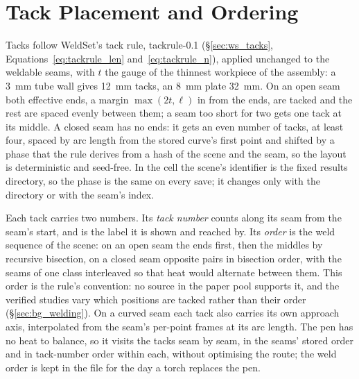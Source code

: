 \section{Tack Placement and Ordering}
\label{sec:mc_tacks}
Tacks follow WeldSet's tack rule, tackrule-0.1 (\S\ref{sec:ws_tacks}, Equations~\ref{eq:tackrule_len}
and~\ref{eq:tackrule_n}), applied unchanged to the weldable seams, with $t$ the gauge
of the thinnest workpiece of the assembly: a 3~mm tube wall gives 12~mm tacks, an 8~mm plate 32~mm. On an
open seam both effective ends, a margin $\max(2t,\ell)$ in from the ends, are tacked and the rest are
spaced evenly between them; a seam too short for two gets one tack at its middle. A closed seam has no
ends: it gets an even number of tacks, at least four, spaced by arc length from the stored curve's first
point and shifted by a phase that the rule derives from a hash of the scene and the seam, so the layout
is deterministic and seed-free. In the cell the scene's identifier is the fixed results directory, so
the phase is the same on every save; it changes only with the directory or with the seam's index.

Each tack carries two numbers. Its \emph{tack number} counts along its seam from the seam's start, and is
the label it is shown and reached by. Its \emph{order} is the weld sequence of the scene: on an open seam the ends
first, then the middles by recursive bisection, on a closed seam opposite pairs in bisection order,
with the seams of one class interleaved so that heat would alternate between them. This order is the
rule's convention: no source in the paper pool supports it, and the verified studies vary which
positions are tacked rather than their order (\S\ref{sec:bg_welding}). On a curved seam each tack also carries its own approach axis, interpolated from
the seam's per-point frames at its arc length. The pen has no heat to balance, so it visits the tacks
seam by seam, in the seams' stored order and in tack-number order within each, without optimising the
route; the weld order is kept in the file for the day a torch replaces the pen.

